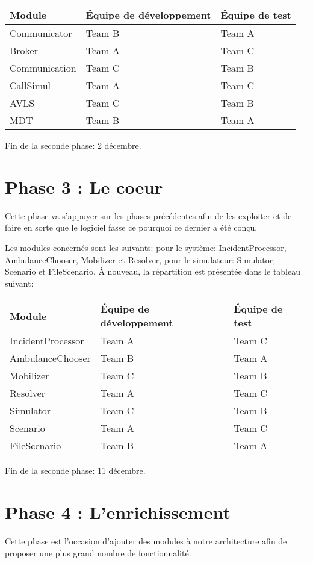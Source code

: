 \noindent\begin{tabularx}{\textwidth}{|l|l|X|}
\hline
Module			& 	Équipe de développement & Équipe de test\\
\hline
Communicator	&	Team B 	&	Team A\\
Broker			&	Team A	&	Team C\\
Communication 	&	Team C	&	Team B	\\
CallSimul		&	Team A	&	Team C	\\
AVLS			&	Team C	&	Team B	\\
MDT				&	Team B	&	Team A	\\
\hline
\end{tabularx}

Fin de la seconde phase: 2 décembre.

\section{Phase 3 : Le coeur}
Cette phase va s'appuyer sur les phases précédentes afin de les exploiter
et de faire en sorte que le logiciel fasse ce pourquoi ce dernier a été conçu.

Les modules concernés sont les suivants: pour le système: IncidentProcessor,
AmbulanceChooser, Mobilizer et Resolver, pour le simulateur: Simulator,
Scenario et FileScenario.
À nouveau, la répartition est présentée dans le tableau suivant:

\noindent\begin{tabularx}{\textwidth}{|l|l|X|}
\hline
Module			& 	Équipe de développement & Équipe de test\\
\hline
IncidentProcessor	&	Team A 	&	Team C\\
AmbulanceChooser	&	Team B	&	Team A\\
Mobilizer 			&	Team C	&	Team B	\\
Resolver			&	Team A	&	Team C	\\
Simulator			&	Team C	&	Team B	\\
Scenario			&	Team A	&	Team C	\\
FileScenario		&	Team B	&	Team A	\\
\hline
\end{tabularx}

Fin de la seconde phase: 11 décembre.

\section{Phase 4 : L'enrichissement}
Cette phase est l'occasion d'ajouter des modules à notre architecture afin de 
proposer une plus grand nombre de fonctionnalité.

